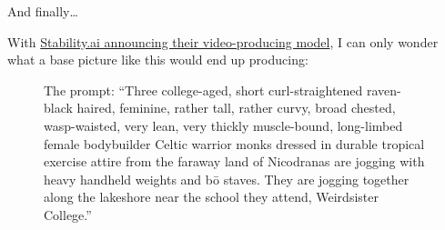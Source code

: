 And finally\ldots{}

With
\href{https://stability.ai/news/stable-video-diffusion-open-ai-video-model}{Stability.ai
announcing their video-producing model}, I can only wonder what a base
picture like this would end up producing:

\begin{figure}
\centering
{}
\caption{The prompt: ``Three college-aged, short curl-straightened
raven-black haired, feminine, rather tall, rather curvy, broad chested,
wasp-waisted, very lean, very thickly muscle-bound, long-limbed female
bodybuilder Celtic warrior monks dressed in durable tropical exercise
attire from the faraway land of Nicodranas are jogging with heavy
handheld weights and bō staves. They are jogging together along the
lakeshore near the school they attend, Weirdsister College.''}
\end{figure}
